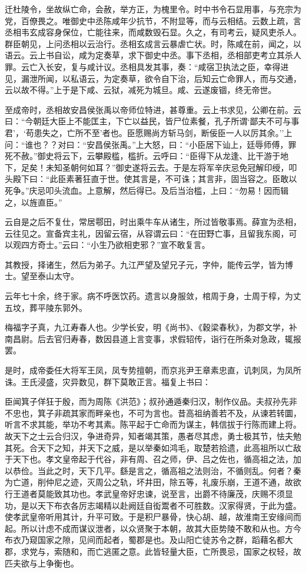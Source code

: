 \documentclass[]{article}
\begin{document}
迁杜陵令，坐故纵亡命，会赦，举方正，为槐里令。时中书令石显用事，与充宗为党，百僚畏之。唯御史中丞陈咸年少抗节，不附显等，而与云相结。云数上疏，言丞相韦玄成容身保位，亡能往来，而咸数毁石显。久之，有司考云，疑风吏杀人。群臣朝见，上问丞相以云治行。丞相玄成言云暴虐亡状。时，陈咸在前，闻之，以语云。云上书自讼，咸为定奏草，求下御史中丞。事下丞相，丞相部吏考立其杀人罪。云亡入长安，复与咸计议。丞相具发其事，奏：``咸宿卫执法之臣，幸得进见，漏泄所闻，以私语云，为定奏草，欲令自下治，后知云亡命罪人，而与交通，云以故不得。''上于是下咸、云狱，减死为城旦。咸、云遂废锢，终无帝世。

至成帝时，丞相故安昌侯张禹以帝师位特进，甚尊重。云上书求见，公卿在前。云曰：``今朝廷大臣上不能匡主，下亡以益民，皆尸位素餐，孔子所谓`鄙夫不可与事君'，`苟患失之，亡所不至'者也。臣愿赐尚方斩马剑，断佞臣一人以厉其余。''上问：``谁也？？对曰：``安昌侯张禹。''上大怒，曰：``小臣居下讪上，廷辱师傅，罪死不赦。''御史将云下，云攀殿槛，槛折。云呼曰：``臣得下从龙逢、比干游于地下，足矣！未知圣朝何如耳？''御史遂将云去。于是左将军辛庆忌免冠解印绶，叩头殿下曰：``此臣素著狂直于世。使其言是，不可诛；其言非，固当容之。臣敢以死争。''庆忌叩头流血。上意解，然后得已。及后当治槛，上曰：``勿易！因而辑之，以旌直臣。''

云自是之后不复仕，常居鄠田，时出乘牛车从诸生，所过皆敬事焉。薛宣为丞相，云往见之。宣备宾主礼，因留云宿，从容谓云曰：``在田野亡事，且留我东阁，可以观四方奇士。''云曰：``小生乃欲相吏邪？''宣不敢复言。

其教授，择诸生，然后为弟子。九江严望及望兄子元，字仲，能传云学，皆为博士。望至泰山太守。

云年七十余，终于家。病不呼医饮药。遗言以身服敛，棺周于身，士周于椁，为丈五坟，葬平陵东郭外。

梅福字子真，九江寿春人也。少学长安，明《尚书》、《穀梁春秋》，为郡文学，补南昌尉。后去官归寿春，数因县道上言变事，求假轺传，诣行在所条对急政，辄报罢。

是时，成帝委任大将军王凤，凤专势擅朝，而京兆尹王章素忠直，讥刺凤，为凤所诛。王氏浸盛，灾异数见，群下莫敢正言。福复上书曰：

臣闻箕子佯狂于殷，而为周陈《洪范》；叔孙通遁秦归汉，制作仪品。夫叔孙先非不忠也，箕子非疏其家而畔亲也，不可为言也。昔高祖纳善若不及，从谏若转圜，听言不求其能，举功不考其素。陈平起于亡命而为谋主，韩信拔于行陈而建上将。故天下之士云合归汉，争进奇异，知者竭其策，愚者尽其虑，勇士极其节，怯夫勉其死。合天下之知，并天下之威，是以举秦如鸿毛，取楚若拾遗，此高祖所以亡敌于天下也。孝文皇帝起于代谷，非有周、召之师，伊、吕之佐也，循高祖之法，加以恭俭。当此之时，天下几平。繇是言之，循高祖之法则治，不循则乱。何者？秦为亡道，削仲尼之迹，灭周公之轨，坏井田，除五等，礼废乐崩，王道不通，故欲行王道者莫能致其功也。孝武皇帝好忠谏，说至言，出爵不待廉茂，庆赐不须显功，是以天下布衣各厉志竭精以赴阙廷自衒鬻者不可胜数。汉家得贤，于此为盛。使孝武皇帝听用其计，升平可致。于是积尸暴骨，快心胡、越，故淮南王安缘间而起。所以计虑不成而谋议泄者，以众贤聚于本朝，故其大臣势陵不敢和从也。方今布衣乃窥国家之隙，见间而起者，蜀郡是也。及山阳亡徒苏令之群，蹈藉名都大郡，求党与，索随和，而亡逃匿之意。此皆轻量大臣，亡所畏忌，国家之权轻，故匹夫欲与上争衡也。
\end{document}
